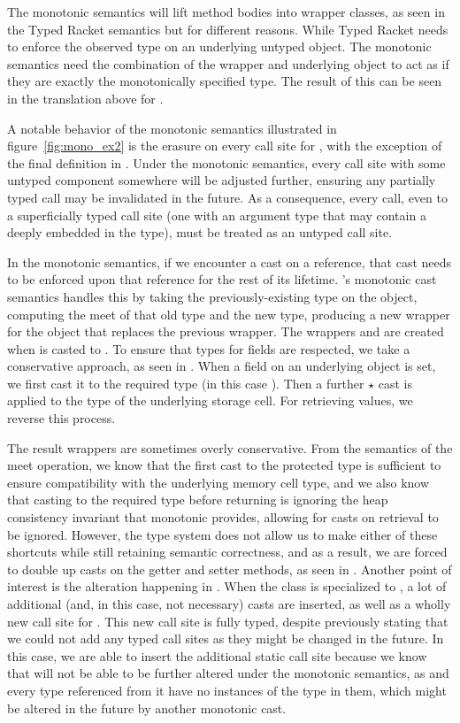 \documentclass[a4paper,USenglish]{tex/lipics-v2016}
\begin{document}
The monotonic semantics will lift method bodies into wrapper classes, as seen in
the Typed Racket semantics but for different reasons. While Typed Racket
needs to enforce the observed type on an underlying untyped object. The
monotonic semantics need the combination of the wrapper and underlying object 
to act as if they are exactly the monotonically specified type. 
The result of this can be seen in the translation above for \m.

A notable behavior of the monotonic semantics illustrated in figure~\ref{fig:mono_ex2}
is the erasure on every call site for \m, with the exception of the final definition in . 
Under the monotonic semantics, every call site with some untyped component somewhere
will be adjusted further, ensuring any partially typed call may be invalidated in the future. 
As a consequence, every call, even to a superficially typed call site (one with an argument
type that may contain a \any deeply embedded in the type), must be treated as an untyped call site.

In the monotonic semantics, if we encounter a cast on a reference, that cast needs to be
enforced upon that reference for the rest of its lifetime. \kafka's monotonic
cast semantics handles this by taking the previously-existing type on the object,
computing the meet of that old type and the new type, producing a new
wrapper for the object that replaces the previous wrapper. The wrappers  and 
are created when \a is casted to .
To ensure that types for fields are respected, we take a conservative approach, 
as seen in . When a field on an underlying object is set, we first cast
it to the required type (in this case ). Then a further $\star$ cast is applied 
to the type of the underlying storage cell. For retrieving values, we reverse this process.

The result wrappers are sometimes overly conservative. From the semantics of the meet operation, we
know that the first cast to the protected type is sufficient to ensure 
compatibility with the underlying memory cell type, and we also know that casting
to the required type before returning is ignoring the heap consistency invariant 
that monotonic provides, allowing for casts on retrieval to be ignored. However,
the \kafka type system does not allow us to make either of these shortcuts while
still retaining semantic correctness, and as a result, we are forced to double 
up casts on the getter and setter methods, as seen in .
Another point of interest is the alteration happening in . When the class 
is specialized to , a lot of additional (and, in this case, not necessary) casts
are inserted, as well as a wholly new call site for \m. This new
call site is fully typed, despite previously stating that we could not add any 
typed call sites as they might be changed in the future.
In this case, we are able to insert the additional static call site because we 
know that  will not be able to be further altered under the monotonic 
semantics, as  and every type referenced from it have no instances of the
type \any in them, which might be altered in the future by another monotonic
cast.
\end{document}
